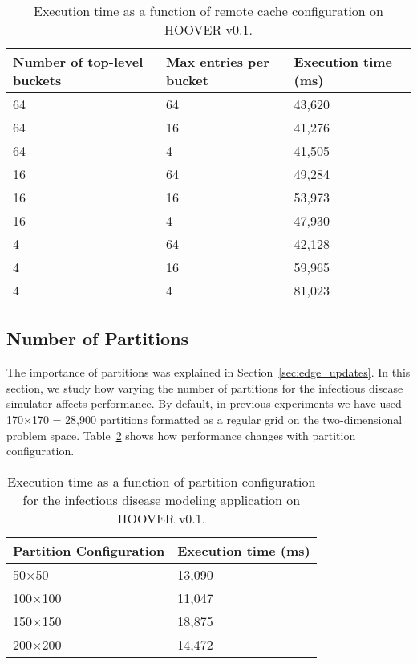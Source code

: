 \begin{table}
\centering
\begin{tabularx}{\textwidth}{ | X | X | X | }
\hline
Number of top-level buckets & Max entries per bucket & Execution time (ms) \\\hline
64                          & 64                     & 43,620 \\\hline
64                          & 16                     & 41,276 \\\hline
64                          & 4                      & 41,505 \\\hline
16                          & 64                     & 49,284 \\\hline
16                          & 16                     & 53,973 \\\hline
16                          & 4                      & 47,930 \\\hline
4                           & 64                     & 42,128 \\\hline
4                           & 16                     & 59,965 \\\hline
4                           & 4                      & 81,023 \\\hline
\end{tabularx}
\caption{Execution time as a function of remote cache configuration on HOOVER v0.1.}
\label{tab:cache}
\end{table}

\subsection{Number of Partitions}

The importance of partitions was explained in Section~\ref{sec:edge_updates}. In
this section, we study how varying the number of partitions for the infectious
disease simulator affects performance. By default, in previous experiments we
have used 170$\times$170 = 28,900 partitions formatted as a regular grid on the
two-dimensional problem space. Table~\ref{tab:partitions} shows how performance
changes with partition configuration.

\begin{table}
\centering
\begin{tabularx}{\textwidth}{ | X | X | }
\hline
Partition Configuration & Execution time (ms) \\\hline
50$\times$50            & 13,090 \\\hline
100$\times$100          & 11,047 \\\hline
150$\times$150          & 18,875 \\\hline
200$\times$200          & 14,472 \\\hline
\end{tabularx}
\caption{Execution time as a function of partition configuration for the
    infectious disease modeling application on HOOVER v0.1.}
\label{tab:partitions}
\end{table}
